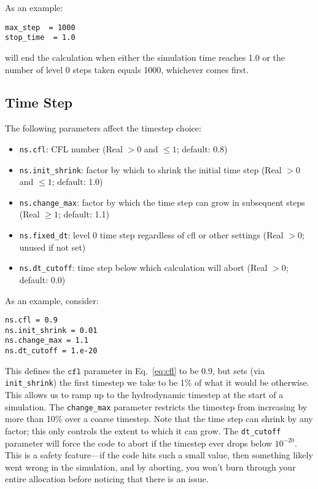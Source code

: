 As an example: 
\begin{lstlisting}
max_step  = 1000
stop_time  = 1.0
\end{lstlisting}
will end the calculation when either the simulation time reaches 1.0 or 
the number of level 0 steps taken equals 1000, whichever comes first.


\subsection{Time Step}

The following parameters affect the timestep choice:
\begin{itemize}
\item {\tt ns.cfl}: CFL number (Real $> 0$ and $\leq 1$; default: 0.8)

\item {\tt ns.init\_shrink}: factor by which to shrink the initial
   time step (Real $> 0$ and $\leq 1$; default: 1.0)

\item {\tt ns.change\_max}: factor by which the time step can grow in
   subsequent steps (Real $\geq 1$; default: 1.1)

\item {\tt ns.fixed\_dt}: level 0 time step regardless of cfl or other settings
   (Real $> 0$; unused if not set)

\item {\tt ns.dt\_cutoff}: time step below which calculation will abort
   (Real $> 0$; default: 0.0)

\end{itemize}

As an example, consider:
\begin{lstlisting}
ns.cfl = 0.9 
ns.init_shrink = 0.01 
ns.change_max = 1.1
ns.dt_cutoff = 1.e-20
\end{lstlisting}
This defines the $\mathtt{cfl}$ parameter in Eq.~\ref{eq:cfl} to be 0.9,
but sets (via {\tt init\_shrink}) the first timestep we take
to be 1\% of what it would be otherwise.  This allows us to
ramp up to the hydrodynamic timestep at the start of a simulation.
The {\tt change\_max} parameter restricts the timestep from increasing
by more than 10\% over a coarse timestep.    Note that the time step
can shrink by any factor; this only controls the extent to which it can grow.
The {\tt dt\_cutoff} parameter will force the code to abort if the
timestep ever drops below $10^{-20}$.  This is a safety feature---if the
code hits such a small value, then something likely went wrong in the
simulation, and by aborting, you won't burn through your entire allocation
before noticing that there is an issue.

